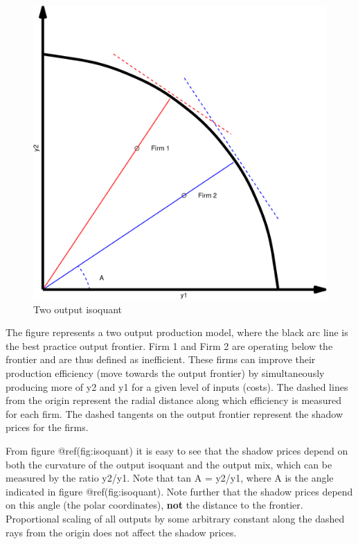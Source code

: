 \documentclass[
  10pt,
]{article}
\begin{document}
\begin{figure}[H]
\includegraphics{figures/paper-isoquant-1} \caption{ Two output isoquant}\label{fig:isoquant}
\end{figure}

\begin{footnotesize} 
The figure represents a two output production model, where the black arc line is the best practice output frontier. Firm 1 and Firm 2 are operating below the frontier and are thus defined as inefficient. These firms can improve their production efficiency (move towards the output frontier) by simultaneously producing more of y2 and y1 for a given level of inputs (costs). The dashed lines from the origin represent the radial distance along which efficiency is measured for each firm.  The dashed tangents on the output frontier represent the shadow prices for the firms.
\end{footnotesize}

From figure @ref(fig:isoquant) it is easy to see that the shadow prices
depend on both the curvature of the output isoquant and the output mix,
which can be measured by the ratio y2/y1. Note that tan A = y2/y1, where
A is the angle indicated in figure @ref(fig:isoquant). Note further that
the shadow prices depend on this angle (the polar coordinates),
\textbf{not} the distance to the frontier. Proportional scaling of all
outputs by some arbitrary constant along the dashed rays from the origin
does not affect the shadow prices.
\end{document}
